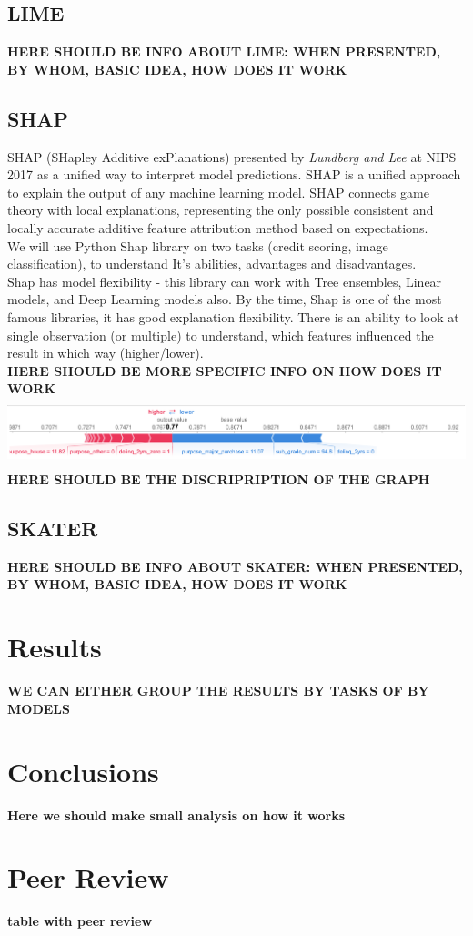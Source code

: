 \subsection{LIME}
\textbf{HERE SHOULD BE INFO ABOUT LIME: WHEN PRESENTED, BY WHOM, BASIC IDEA, HOW DOES IT WORK}

\subsection{SHAP}
SHAP (SHapley Additive exPlanations) presented by \textit{Lundberg and Lee} \cite{SHAP} at NIPS 2017 as a unified way to interpret model predictions. 
SHAP is a unified approach to explain the output of any machine learning model. SHAP connects game theory with local explanations, representing the only possible consistent and locally accurate additive feature attribution method based on expectations. \\
We will use Python Shap library on two tasks (credit scoring, image classification), to understand It's abilities, advantages and disadvantages.\\
Shap has model flexibility - this library can work with Tree ensembles, Linear models, and Deep Learning models also. By the time, Shap is one of the most famous libraries, it has good explanation flexibility. There is an ability to look at single observation (or multiple) to understand, which features influenced the result in which way (higher/lower). \\
\textbf{HERE SHOULD BE MORE SPECIFIC INFO ON HOW DOES IT WORK}
\includegraphics[height=2cm]{shap_ex1.png}\\[0.5cm] 
\textbf{HERE SHOULD BE THE DISCRIPRIPTION OF THE GRAPH}

\subsection{SKATER}
\textbf{HERE SHOULD BE INFO ABOUT SKATER: WHEN PRESENTED, BY WHOM, BASIC IDEA, HOW DOES IT WORK}

\section{Results}
\textbf{WE CAN EITHER GROUP THE RESULTS BY TASKS OF BY MODELS}

\section{Conclusions}
\textbf{Here we should make small analysis on how it works}

\section{Peer Review}
\textbf{table with peer review}

\newpage
\printbibliography
